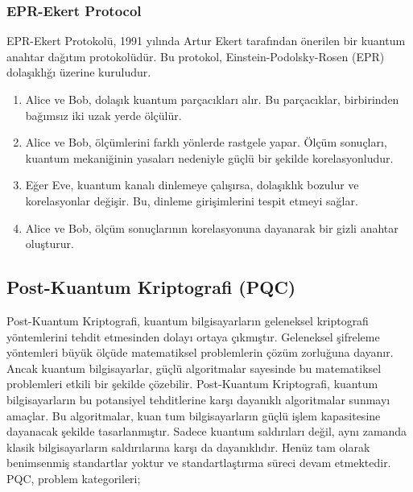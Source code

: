 \subsubsection{EPR-Ekert Protocol}

EPR-Ekert Protokolü, 1991 yılında Artur Ekert tarafından önerilen bir kuantum anahtar dağıtım protokolüdür. Bu protokol, Einstein-Podolsky-Rosen (EPR) dolaşıklığı üzerine kuruludur. 

\begin{enumerate}
    \item Alice ve Bob, dolaşık kuantum parçacıkları alır. Bu parçacıklar, birbirinden bağımsız iki uzak yerde ölçülür.
    \item Alice ve Bob, ölçümlerini farklı yönlerde rastgele yapar. Ölçüm sonuçları, kuantum mekaniğinin yasaları nedeniyle güçlü bir şekilde korelasyonludur.
    \item Eğer Eve, kuantum kanalı dinlemeye çalışırsa, dolaşıklık bozulur ve korelasyonlar değişir. Bu, dinleme girişimlerini tespit etmeyi sağlar.
    \item Alice ve Bob, ölçüm sonuçlarının korelasyonuna dayanarak bir gizli anahtar oluşturur.
\end{enumerate}

\newpage

\subsection{Post-Kuantum Kriptografi (PQC)}

Post-Kuantum Kriptografi, kuantum bilgisayarların geleneksel kriptografi yöntemlerini tehdit etmesinden dolayı ortaya çıkmıştır. Geleneksel şifreleme yöntemleri büyük ölçüde matematiksel problemlerin çözüm zorluğuna dayanır. Ancak kuantum bilgisayarlar, güçlü algoritmalar sayesinde bu matematiksel problemleri etkili bir şekilde çözebilir. Post-Kuantum Kriptografi, kuantum bilgisayarların bu potansiyel tehditlerine karşı dayanıklı algoritmalar sunmayı amaçlar. Bu algoritmalar, kuan tum bilgisayarların güçlü işlem kapasitesine dayanacak şekilde tasarlanmıştır. Sadece kuantum saldırıları değil, aynı zamanda klasik bilgisayarların saldırılarına karşı da dayanıklıdır. Henüz tam olarak benimsenmiş standartlar yoktur ve standartlaştırma süreci devam etmektedir. PQC, problem kategorileri;


